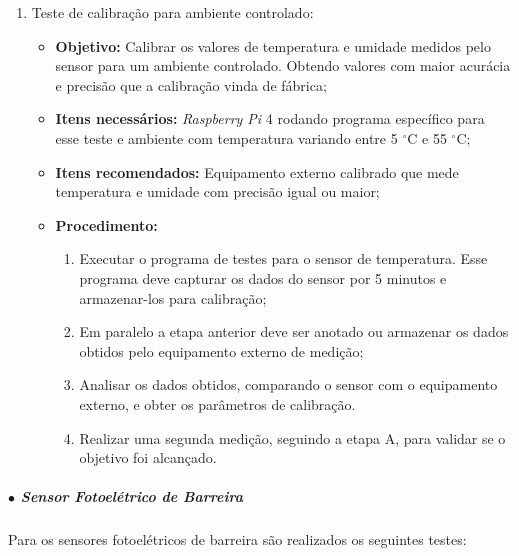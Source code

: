 \begin{enumerate}
    \item Teste de calibração para ambiente controlado:
    
    \begin{itemize}
        \item \textbf{Objetivo:} Calibrar os valores de temperatura e umidade medidos pelo sensor para um ambiente controlado. Obtendo valores com maior acurácia e precisão que a calibração vinda de fábrica;
        \item \textbf{Itens necessários:} \textit{Raspberry Pi} 4 rodando programa específico para esse teste e ambiente com temperatura variando entre 5 $ ^\circ$C e 55 $^\circ$C;
        \item \textbf{Itens recomendados:} Equipamento externo calibrado que mede temperatura e umidade com precisão igual ou maior;
        \item \textbf{Procedimento:} 
        \begin{enumerate}
            \item Executar o programa de testes para o sensor de temperatura. Esse programa deve capturar os dados do sensor por 5 minutos e armazenar-los para calibração;
            \item Em paralelo a etapa anterior deve ser anotado ou armazenar os dados obtidos pelo equipamento externo de medição;
            \item Analisar os dados obtidos, comparando o sensor com o equipamento externo, e obter os parâmetros de calibração.
            \item Realizar uma segunda medição, seguindo a etapa A, para validar se o objetivo foi alcançado.
        \end{enumerate}
    \end{itemize}

\end{enumerate}

\subparagraph*{$\bullet$ Sensor Fotoelétrico de Barreira} \hfill

Para os sensores fotoelétricos de barreira são realizados os seguintes testes:

